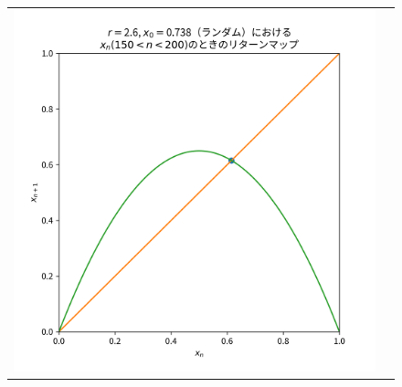 \begin{figure}[htbp]
\begin{tabular}{cc}
\begin{minipage}[t]{0.45\hsize}
      \includegraphics[keepaspectratio, scale=0.3]{images/Problem3/report4_2.png}
    \end{minipage} \\


\end{tabular}
\end{figure}
